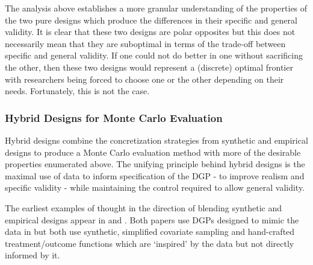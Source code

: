 \documentclass[../main.tex]{subfiles}
\begin{document}
The analysis above establishes a more granular understanding of the properties of the two pure designs which produce the differences in their specific and general validity. It is clear that these two designs are polar opposites but this does not necessarily mean that they are suboptimal in terms of the trade-off between specific and general validity. If one could not do better in one without sacrificing the other, then these two designs would represent a (discrete) optimal frontier with researchers being forced to choose one or the other depending on their needs. Fortunately, this is not the case.

\subsubsection{Hybrid Designs for Monte Carlo Evaluation}

Hybrid designs combine the concretization strategies from synthetic and empirical designs to produce a Monte Carlo evaluation method with more of the desirable properties enumerated above. The unifying principle behind hybrid designs is the maximal use of data to inform specification of the DGP - to improve realism and specific validity - while maintaining the control required to allow general validity.\par


\vspace{\baselineskip}
The earliest examples of thought in the direction of blending synthetic and empirical designs appear in \textcite{Abadie2002LargeEffects} and \textcite{Diamond2012GeneticStudies}. Both papers use DGPs designed to mimic the data in \textcite{Lalonde1986EvaluatingData} but both use synthetic, simplified covariate sampling and hand-crafted treatment/outcome functions which are ‘inspired’ by the data but not directly informed by it.\par
\end{document}
